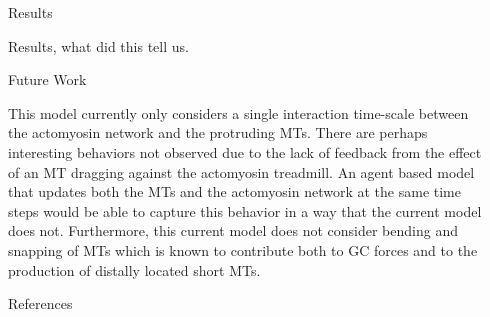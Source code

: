 \documentclass{beamer}
\newlength{\sepwidth}
\newlength{\colwidth}
\newcommand{\separatorcolumn}{\begin{column}{\sepwidth}\end{column}}
\begin{document}
\begin{frame}[t]
\begin{columns}[t]
\begin{column}{\colwidth}
\begin{block}{Results}

Results, what did this tell us.

\end{block}

\begin{block}{Future Work}

This model currently only considers a single interaction time-scale between the actomyosin network and the protruding MTs. There are perhaps interesting behaviors not observed due to the lack of feedback from the effect of an MT dragging against the actomyosin treadmill. An agent based model that updates both the MTs and the actomyosin network at the same time steps would be able to capture this behavior in a way that the current model does not. Furthermore, this current model does not consider bending and snapping of MTs which is known to contribute both to GC forces and to the production of distally located short MTs.

\end{block}

\begin{block}{References}
\begin{multicols}{2}
\fontsize{16pt}{12pt}\selectfont

% 

\end{multicols}
\end{block}

\end{column}
\separatorcolumn%

\end{columns}
\end{frame}
\end{document}
